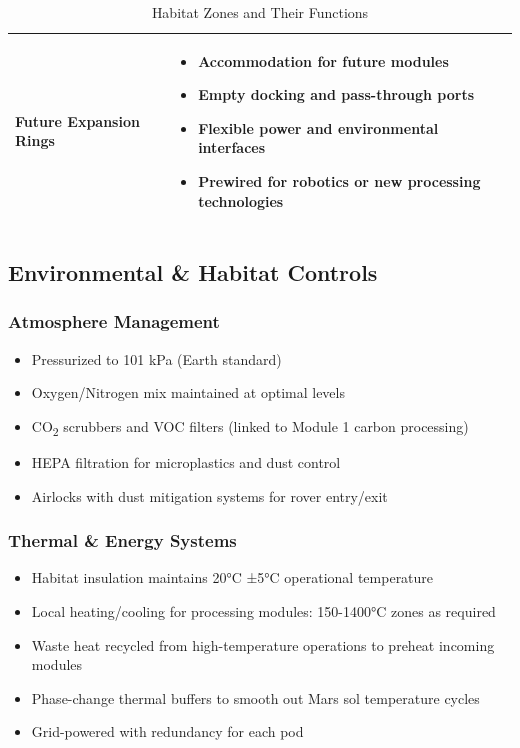 \documentclass[12pt, a4paper]{article}
\begin{document}
\begin{table}[h!]
\begin{tabular}{p{} p{}}
Future Expansion Rings &
\begin{itemize}
\setlength\itemsep{0.1em}
\item Accommodation for future modules
\item Empty docking and pass-through ports
\item Flexible power and environmental interfaces
\item Prewired for robotics or new processing technologies
\end{itemize} \\
\bottomrule
\end{tabular}
\caption{Habitat Zones and Their Functions}
\end{table}
\normalsize

\subsection{Environmental \& Habitat Controls}

\subsubsection{Atmosphere Management}
\begin{itemize}
    \item Pressurized to 101 kPa (Earth standard)
    \item Oxygen/Nitrogen mix maintained at optimal levels
    \item CO\textsubscript{2} scrubbers and VOC filters (linked to Module 1 carbon processing)
    \item HEPA filtration for microplastics and dust control
    \item Airlocks with dust mitigation systems for rover entry/exit
\end{itemize}

\subsubsection{Thermal \& Energy Systems}
\begin{itemize}
    \item Habitat insulation maintains 20°C ±5°C operational temperature
    \item Local heating/cooling for processing modules: 150-1400°C zones as required
    \item Waste heat recycled from high-temperature operations to preheat incoming modules
    \item Phase-change thermal buffers to smooth out Mars sol temperature cycles
    \item Grid-powered with redundancy for each pod
\end{itemize}
\end{document}
